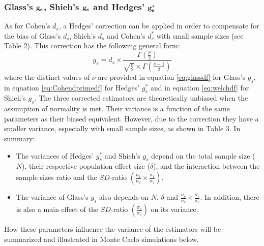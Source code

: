 \documentclass[
  english,
  man,floatsintext]{apa6}
\providecommand{\tightlist}{%
  \setlength{\itemsep}{0pt}\setlength{\parskip}{0pt}}
\begin{document}
\hypertarget{glasss-bf-g_s-shiehs-bf-g_s-and-hedges-bf-g_s}{%
\subsubsection{\texorpdfstring{Glass's \(\bf g_s\), Shieh's \(\bf g_s\) and Hedges' \(\bf g^*_s\)}{Glass's \textbackslash bf g\_s, Shieh's \textbackslash bf g\_s and Hedges' \textbackslash bf g\^{}*\_s}}\label{glasss-bf-g_s-shiehs-bf-g_s-and-hedges-bf-g_s}}

As for Cohen's \(d_s\), a Hedges' correction can be applied in order to compensate for the bias of Glass's \(d_s\), Shieh's \(d_s\) and Cohen's \(d^*_s\) with small sample sizes (see Table 2). This correction has the following general form:
\begin{equation*} 
g_s = d_s \times \frac{\Gamma(\frac{\nu}{2})}{\sqrt{\frac{\nu}{2}} \times \Gamma(\frac{\nu-1}{2})}
\end{equation*}
where the distinct values of \(\nu\) are provided in equation \ref{eq:glassdf} for Glass's \(g_s\), in equation \ref{eq:Cohendprimedf} for Hedges' \(g^*_s\) and in equation \ref{eq:welchdf} for Shieh's \(g_s\). The three corrected estimators are theoretically unbiased when the assumption of normality is met. Their variance is a function of the same parameters as their biased equivalent. However, due to the correction they have a smaller variance, especially with small sample sizes, as shown in Table 3. In summary:

\begin{itemize}
\tightlist
\item
  The variances of Hedges' \(g^*_s\) and Shieh's \(g_s\) depend on the total sample size (\(N\)), their respective population effect size (\(\delta\)), and the interaction between the sample sizes ratio and the \(SD\)-ratio \(\left(\frac{n_1}{n_2}\times\frac{\sigma_1}{\sigma_2} \right)\).\\
\item
  The variance of Glass's \(g_s\) also depends on \(N\), \(\delta\) and \(\frac{n_c}{n_e}\times\frac{\sigma_c}{\sigma_e}\). In addition, there is also a main effect of the \(SD\)-ratio \(\left(\frac{\sigma_c}{\sigma_e} \right)\) on its variance.
\end{itemize}

How these parameters influence the variance of the estimators will be summarized and illustrated in Monte Carlo simulations below.
\end{document}
